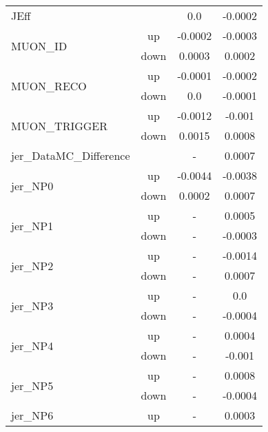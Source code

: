 \begin{table}[h!]
\begin{tabular}{lccc}
\multirow{2}{*}{JEff}  &  & \multirow{2}{*}{0.0}   & \multirow{2}{*}{-0.0002}  \\  \\ \hline
\multirow{2}{*}{MUON\_ID}      & up   &     -0.0002     &     -0.0003      \\
                                       & down &        0.0003     &     0.0002       \\ \hline
\multirow{2}{*}{MUON\_RECO}      & up   &        -0.0001     &     -0.0002      \\
                                       & down &      0.0     &     -0.0001       \\ \hline
\multirow{2}{*}{MUON\_TRIGGER}      & up   &         -0.0012     &     -0.001      \\
                                       & down &       0.0015     &     0.0008       \\ \hline
\multirow{2}{*}{jer\_DataMC\_Difference}  &  &  \multirow{2}{*}{-}  & \multirow{2}{*}{0.0007}  \\  \\ \hline
\multirow{2}{*}{jer\_NP0}      & up   &        -0.0044     &     -0.0038      \\
                                       & down &         0.0002     &     0.0007       \\ \hline
\multirow{2}{*}{jer\_NP1}      & up   &     -      &     0.0005      \\
                                       & down &      -    &     -0.0003       \\ \hline
\multirow{2}{*}{jer\_NP2}      & up   &     -    &     -0.0014      \\
                                       & down &    -     &     0.0007       \\ \hline
\multirow{2}{*}{jer\_NP3}      & up   &     -      &     0.0      \\
                                       & down &   -     &     -0.0004       \\ \hline
\multirow{2}{*}{jer\_NP4}      & up   &     -     &     0.0004      \\
                                       & down &       -     &     -0.001       \\ \hline
\multirow{2}{*}{jer\_NP5}      & up   &     -     &     0.0008      \\
                                       & down &    -    &     -0.0004       \\ \hline
\multirow{2}{*}{jer\_NP6}      & up   &    -      &     0.0003      \\

\end{tabular}
\end{table}

